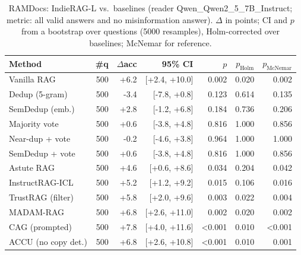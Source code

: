 \begin{table}[tbp]
\centering
\small
\caption{RAMDocs: IndieRAG-L vs.\ baselines (reader Qwen\_Qwen2\_5\_7B\_Instruct; metric: all valid answers and no misinformation answer). $\Delta$ in points; CI and $p$ from a bootstrap over questions (5000 resamples), Holm-corrected over baselines; McNemar for reference.}
\label{tab:sig:ramdocs}
\setlength{\tabcolsep}{4pt}
\begin{tabular}{lrrrrrr}
\toprule
Method & \#q & $\Delta$acc & 95\% CI & $p$ & $p_{\text{Holm}}$ & $p_{\text{McNemar}}$ \\
\midrule
Vanilla RAG & 500 & +6.2 & [+2.4, +10.0] & 0.002 & 0.020 & 0.002 \\
Dedup (5-gram) & 500 & -3.4 & [-7.8, +0.8] & 0.123 & 0.614 & 0.135 \\
SemDedup (emb.) & 500 & +2.8 & [-1.2, +6.8] & 0.184 & 0.736 & 0.206 \\
Majority vote & 500 & +0.6 & [-3.8, +4.8] & 0.816 & 1.000 & 0.856 \\
Near-dup + vote & 500 & -0.2 & [-4.6, +3.8] & 0.964 & 1.000 & 1.000 \\
SemDedup + vote & 500 & +0.6 & [-3.8, +4.8] & 0.816 & 1.000 & 0.856 \\
Astute RAG & 500 & +4.6 & [+0.6, +8.6] & 0.034 & 0.204 & 0.042 \\
InstructRAG-ICL & 500 & +5.2 & [+1.2, +9.2] & 0.015 & 0.106 & 0.016 \\
TrustRAG (filter) & 500 & +5.8 & [+2.0, +9.6] & 0.003 & 0.022 & 0.004 \\
MADAM-RAG & 500 & +6.8 & [+2.6, +11.0] & 0.002 & 0.020 & 0.002 \\
CAG (prompted) & 500 & +7.8 & [+4.0, +11.6] & <0.001 & 0.010 & <0.001 \\
ACCU (no copy det.) & 500 & +6.8 & [+2.6, +10.8] & <0.001 & 0.010 & 0.001 \\
\bottomrule
\end{tabular}
\end{table}
